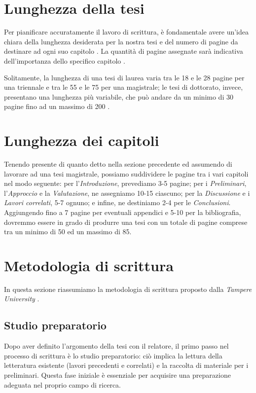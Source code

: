 \section{Lunghezza della tesi}

Per pianificare accuratamente il lavoro di scrittura, è fondamentale avere un'idea chiara della lunghezza desiderata per la nostra tesi e del numero di pagine da destinare ad ogni suo capitolo \cite{mannisto2022guide}. La quantità di pagine assegnate sarà indicativa dell'importanza dello specifico capitolo \cite{tuni2019guide}.

\medskip

Solitamente, la lunghezza di una tesi di laurea varia tra le 18 e le 28 pagine per una triennale e tra le 55 e le 75 per una magistrale; le tesi di dottorato, invece, presentano una lunghezza più variabile, che può andare da un minimo di 30 pagine fino ad un massimo di 200 \cite{tuni2019guide}.

\section{Lunghezza dei capitoli}

Tenendo presente di quanto detto nella sezione precedente ed assumendo di lavorare ad una tesi magistrale, possiamo suddividere le pagine tra i vari capitoli nel modo seguente: per l'\textit{Introduzione}, prevediamo 3-5 pagine; per i \textit{Preliminari}, l'\textit{Approccio} e la \textit{Valutazione}, ne assegniamo 10-15 ciascuno; per la \textit{Discussione} e i \textit{Lavori correlati}, 5-7 ognuno; e infine, ne destiniamo 2-4 per le \textit{Conclusioni}. Aggiungendo fino a 7 pagine per eventuali appendici e 5-10 per la bibliografia, dovremmo essere in grado di produrre una tesi con un totale di pagine comprese tra un minimo di 50 ed un massimo di 85.

\section{Metodologia di scrittura}

In questa sezione riassumiamo la metodologia di scrittura proposto dalla \textit{Tampere University} \cite{tuni2019guide}.

\subsection{Studio preparatorio}

Dopo aver definito l'argomento della tesi con il relatore, il primo passo nel processo di scrittura è lo studio preparatorio: ciò implica la lettura della letteratura esistente (lavori precedenti e correlati) e la raccolta di materiale per i preliminari. Questa fase iniziale è essenziale per acquisire una preparazione adeguata nel proprio campo di ricerca.

